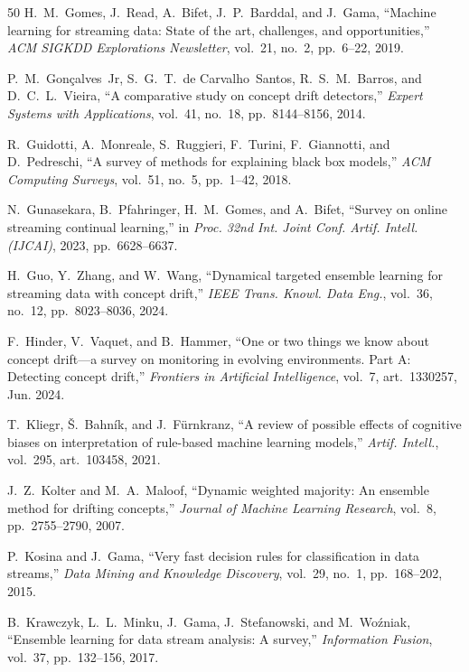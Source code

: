 \documentclass[lettersize,journal]{IEEEtran}
\begin{document}
\begin{thebibliography}{50}
H.~M.~Gomes, J.~Read, A.~Bifet, J.~P.~Barddal, and J.~Gama, ``Machine learning for streaming data: State of the art, challenges, and opportunities,'' \textit{ACM SIGKDD Explorations Newsletter}, vol.~21, no.~2, pp.~6--22, 2019.

P.~M.~Gon\c{c}alves~Jr, S.~G.~T.~de Carvalho~Santos, R.~S.~M.~Barros, and D.~C.~L.~Vieira, ``A comparative study on concept drift detectors,'' \textit{Expert Systems with Applications}, vol.~41, no.~18, pp.~8144--8156, 2014.

R.~Guidotti, A.~Monreale, S.~Ruggieri, F.~Turini, F.~Giannotti, and D.~Pedreschi, ``A survey of methods for explaining black box models,'' \textit{ACM Computing Surveys}, vol.~51, no.~5, pp.~1--42, 2018.

N.~Gunasekara, B.~Pfahringer, H.~M.~Gomes, and A.~Bifet, ``Survey on online streaming continual learning,'' in \textit{Proc. 32nd Int. Joint Conf. Artif. Intell. (IJCAI)}, 2023, pp.~6628--6637.

H.~Guo, Y.~Zhang, and W.~Wang, ``Dynamical targeted ensemble learning for streaming data with concept drift,'' \textit{IEEE Trans. Knowl. Data Eng.}, vol.~36, no.~12, pp.~8023--8036, 2024.

F.~Hinder, V.~Vaquet, and B.~Hammer, ``One or two things we know about concept drift---a survey on monitoring in evolving environments. {P}art {A}: Detecting concept drift,'' \textit{Frontiers in Artificial Intelligence}, vol.~7, art.~1330257, Jun. 2024.

T.~Kliegr, \v{S}.~Bahn\'{i}k, and J.~F\"{u}rnkranz, ``A review of possible effects of cognitive biases on interpretation of rule-based machine learning models,'' \textit{Artif. Intell.}, vol.~295, art.~103458, 2021.

J.~Z.~Kolter and M.~A.~Maloof, ``Dynamic weighted majority: An ensemble method for drifting concepts,'' \textit{Journal of Machine Learning Research}, vol.~8, pp.~2755--2790, 2007.

P.~Kosina and J.~Gama, ``Very fast decision rules for classification in data streams,'' \textit{Data Mining and Knowledge Discovery}, vol.~29, no.~1, pp.~168--202, 2015.

B.~Krawczyk, L.~L.~Minku, J.~Gama, J.~Stefanowski, and M.~Wo\'{z}niak, ``Ensemble learning for data stream analysis: A survey,'' \textit{Information Fusion}, vol.~37, pp.~132--156, 2017.


\end{thebibliography}
\end{document}

